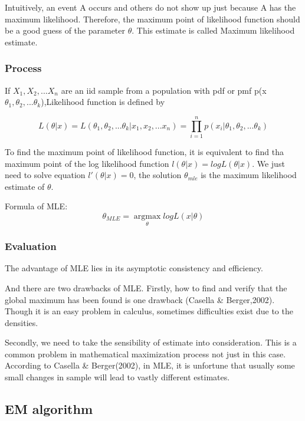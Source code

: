 \documentclass[
]{article}
\begin{document}
Intuitively, an event A occurs and others do not show up just because A
has the maximum likelihood. Therefore, the maximum point of likelihood
function should be a good guess of the parameter \(\theta\). This
estimate is called Maximum likelihood estimate.

\hypertarget{process}{%
\subsubsection{Process}\label{process}}

If \(X_1,X_2,...X_n\) are an iid sample from a population with pdf or
pmf p(x\textbar{}\(\theta_1,\theta_2,...\theta_k\)),Likelihood function
is defined by

\[L(\theta|x)=L(\theta_1,\theta_2,...\theta_k|x_1,x_2,...x_n)=\prod_{i=1}^{n}p(x_i|\theta_1,\theta_2,...\theta_k)\]

To find the maximum point of likelihood function, it is equivalent to
find tha maximum point of the log likelihood function
\(l(\theta|x)=logL(\theta|x)\). We just need to solve equation
\(l'(\theta|x)=0\), the solution \(\theta_{mle}\) is the maximum
likelihood estimate of \(\theta\).

Formula of MLE:
\[\theta_{MLE}=\mathop{argmax}\limits _{\theta}log{L(x|\theta)}\]

\hypertarget{evaluation}{%
\subsubsection{Evaluation}\label{evaluation}}

The advantage of MLE lies in its asymptotic consistency and efficiency.

And there are two drawbacks of MLE. Firstly, how to find and verify that
the global maximum has been found is one drawback (Casella \&
Berger,2002). Though it is an easy problem in calculus, sometimes
difficulties exist due to the densities.

Secondly, we need to take the sensibility of estimate into
consideration. This is a common problem in mathematical maximization
process not just in this case. According to Casella \& Berger(2002), in
MLE, it is unfortune that usually some small changes in sample will lead
to vastly different estimates.

\hypertarget{em-algorithm}{%
\subsection{EM algorithm}\label{em-algorithm}}
\end{document}
